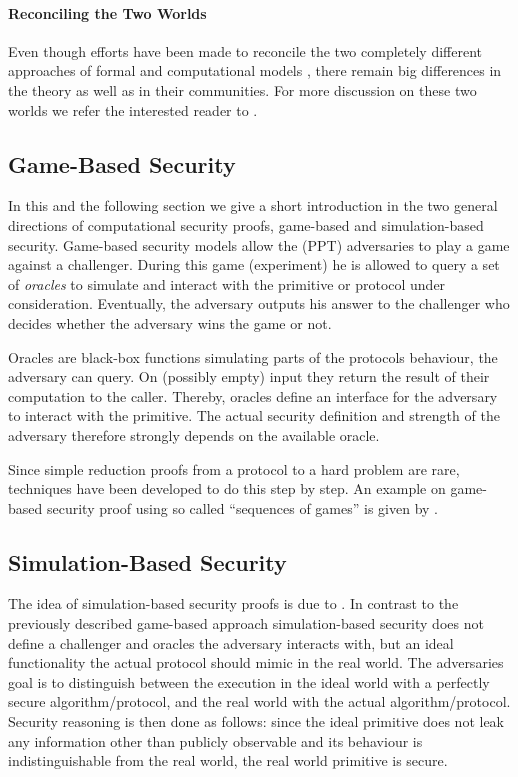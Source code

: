 \paragraph{Reconciling the Two Worlds}
Even though efforts have been made to reconcile the two completely different approaches of formal and computational models \cite{Abadi2002,Herzog2005}, there remain big differences in the theory as well as in their communities.
For more discussion on these two worlds we refer the interested reader to \citet{cortier2011survey}.

\subsection{Game-Based Security}
In this and the following section we give a short introduction in the two general directions of computational security proofs, game-based and simulation-based security.
Game-based security models allow the (\ac{PPT}) adversaries to play a game against a challenger.
During this game (\aka experiment) he is allowed to query a set of \emph{oracles} to simulate and interact with the primitive or protocol under consideration.
Eventually, the adversary outputs his answer to the challenger who decides whether the adversary wins the game or not.

Oracles are black-box functions simulating parts of the protocols behaviour, the adversary can query.
On (possibly empty) input they return the result of their computation to the caller.
Thereby, oracles define an interface for the adversary to interact with the primitive.
The actual security definition and strength of the adversary therefore strongly depends on the available oracle.

Since simple reduction proofs from a protocol to a hard problem are rare, techniques have been developed to do this step by step.
An example on game-based security proof using so called ``sequences of games'' is given by \citet{Shoup2004}.

\subsection{Simulation-Based Security}
The idea of simulation-based security proofs is due to \citet{Goldreich87}.
In contrast to the previously described game-based approach simulation-based security does not define a challenger and oracles the adversary interacts with, but an ideal functionality the actual protocol should mimic in the real world.
The adversaries goal is to distinguish between the execution in the ideal world with a perfectly secure algorithm/protocol, and the real world with the actual algorithm/protocol.
Security reasoning is then done as follows: since the ideal primitive does not leak any information other than publicly observable and its behaviour is indistinguishable from the real world, the real world primitive is secure.

